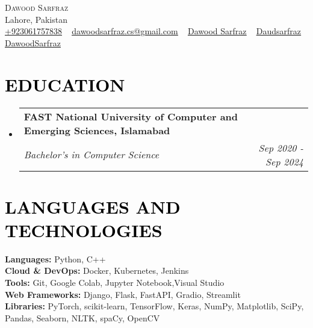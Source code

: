 \documentclass[letterpaper,11pt]{article}
\makeatletter
\newcommand{\resumeSubheading}[4]{
	\vspace{-2pt}\item
	\begin{tabular*}{1.0\textwidth}[t]{l@{\extracolsep{\fill}}r}
		\textbf{\large#1} & \textbf{\small #2} \\
		\textit{\large#3} & \textit{\small #4} \\
		
	\end{tabular*}\vspace{-7pt}
}
\newcommand{\resumeSubHeadingListStart}{\begin{itemize}[leftmargin=0.0in, label={}]}
\newcommand{\resumeSubHeadingListEnd}{\end{itemize}}
\makeatother
\begin{document}
	
	
	
	\begin{center}
		{\Huge \scshape Dawood Sarfraz} \\ \vspace{1pt}
		Lahore, Pakistan \\ \vspace{1pt}
		\small 
		\href{tel:+9203061757838}{\raisebox{-0.1\height}{\faPhone} \underline{{+923061757838}}} ~ 
		\href{mailto:dawoodsarfraz.cs@gmail.com}{\raisebox{-0.2\height}{\faEnvelope} \underline{{dawoodsarfraz.cs@gmail.com}}} ~ 
		\href{https://linkedin.com/in/dawood-sarfraz-0466541b6}{\raisebox{-0.2\height}{\faLinkedin}  \underline{{Dawood Sarfraz}}} ~
		\href{https://github.com/Daudsarfraz}{\raisebox{-0.2\height}{\faGithub} \underline{{Daudsarfraz}}} ~
		\href{https://daudsarfraz.github.io/DawoodSarfraz/}{\raisebox{-0.2\height}{\faGlobe} \underline{{DawoodSarfraz}}}
		\vspace{-5pt}
	\end{center}
	
	
	\section{\textcolor{black}{EDUCATION}}
	\resumeSubHeadingListStart
	\resumeSubheading
	{FAST National University of Computer and Emerging Sciences, Islamabad}{}
	{Bachelor's in Computer Science }{Sep 2020 - Sep 2024}
	\resumeSubHeadingListEnd
	\vspace{-12pt}

	\section{\textcolor{black}{LANGUAGES AND TECHNOLOGIES}}
	\begin{itemize}[leftmargin=0.01in, label={}]
		{\item{
				\textbf{\normalsize{Languages:}}{ \normalsize{Python, C++}} \\
				\textbf{\normalsize{Cloud \& DevOps:}}{ \normalsize{Docker, Kubernetes, Jenkins}} \\
				\textbf{\normalsize{Tools:}}{ \normalsize{Git, Google Colab, Jupyter Notebook,Visual Studio}} \\		
				\textbf{\normalsize{Web Frameworks:}}{ \normalsize{Django, Flask, FastAPI, Gradio, Streamlit}} \\
				\textbf{\normalsize{Libraries:}}{ \normalsize{PyTorch, scikit-learn, TensorFlow, Keras, NumPy, Matplotlib, SciPy, Pandas, Seaborn, NLTK, spaCy, OpenCV}} \\
		}}
	\end{itemize}
	\vspace{-18pt}
	
\end{document}
